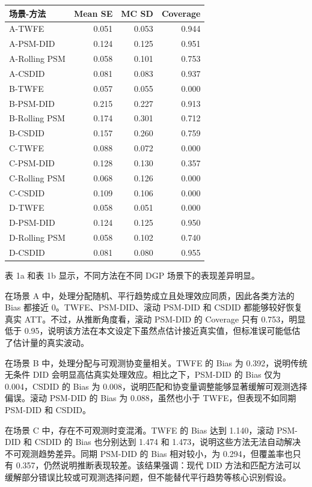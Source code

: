 \documentclass[
  fontset=windows]{ctexart}
\newcounter{none} %
\begin{document}
{\def\LTcaptype{none} %
\begin{longtable}[]{@{}lrrr@{}}
\toprule\noalign{}
场景-方法 & Mean SE & MC SD & Coverage \\
\midrule\noalign{}
\endhead
\bottomrule\noalign{}
\endlastfoot
A-TWFE & 0.051 & 0.053 & 0.944 \\
A-PSM-DID & 0.124 & 0.125 & 0.951 \\
A-Rolling PSM & 0.058 & 0.101 & 0.753 \\
A-CSDID & 0.081 & 0.083 & 0.937 \\
B-TWFE & 0.057 & 0.055 & 0.000 \\
B-PSM-DID & 0.215 & 0.227 & 0.913 \\
B-Rolling PSM & 0.174 & 0.301 & 0.712 \\
B-CSDID & 0.157 & 0.260 & 0.759 \\
C-TWFE & 0.088 & 0.072 & 0.000 \\
C-PSM-DID & 0.128 & 0.130 & 0.357 \\
C-Rolling PSM & 0.068 & 0.126 & 0.000 \\
C-CSDID & 0.109 & 0.106 & 0.000 \\
D-TWFE & 0.058 & 0.051 & 0.000 \\
D-PSM-DID & 0.124 & 0.125 & 0.950 \\
D-Rolling PSM & 0.058 & 0.102 & 0.740 \\
D-CSDID & 0.081 & 0.080 & 0.955 \\
\end{longtable}
}

表 1a 和表 1b 显示，不同方法在不同 DGP 场景下的表现差异明显。

在场景 A 中，处理分配随机、平行趋势成立且处理效应同质，因此各类方法的
Bias 都接近 0。TWFE、PSM-DID、滚动 PSM-DID 和 CSDID 都能够较好恢复真实
ATT。不过，从推断角度看，滚动 PSM-DID 的 Coverage 只有 0.753，明显低于
0.95，说明该方法在本文设定下虽然点估计接近真实值，但标准误可能低估了估计量的真实波动。

在场景 B 中，处理分配与可观测协变量相关。TWFE 的 Bias 为
0.392，说明传统无条件 DID 会明显高估真实处理效应。相比之下，PSM-DID 的
Bias 仅为 0.004，CSDID 的 Bias 为
0.008，说明匹配和协变量调整能够显著缓解可观测选择偏误。滚动 PSM-DID 的
Bias 为 0.088，虽然也小于 TWFE，但表现不如同期 PSM-DID 和 CSDID。

在场景 C 中，存在不可观测时变混淆。TWFE 的 Bias 达到 1.140，滚动 PSM-DID
和 CSDID 的 Bias 也分别达到 1.474 和
1.473，说明这些方法无法自动解决不可观测趋势差异。同期 PSM-DID 的 Bias
相对较小，为 0.294，但覆盖率也只有
0.357，仍然说明推断表现较差。该结果强调：现代 DID
方法和匹配方法可以缓解部分错误比较或可观测选择问题，但不能替代平行趋势等核心识别假设。
\end{document}
